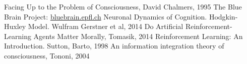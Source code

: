 \documentclass[a4paper, 12pt]{article}
\begin{document}
\begin{thebibliography}{20}
 Facing Up to the Problem of Consciousness, David Chalmers, 1995
 The Blue Brain Project: \href{https://bluebrain.epfl.ch/}{bluebrain.epfl.ch}
 Neuronal Dynamics of Cognition. Hodgkin-Huxley Model. Wulfram Gerstner et al, 2014
 Do Artificial Reinforcement-Learning Agents Matter Morally, Tomasik, 2014
 Reinforcement Learning: An Introduction. Sutton, Barto, 1998
 An information integration theory of consciousness, Tononi, 2004
\end{thebibliography}
\end{document}
